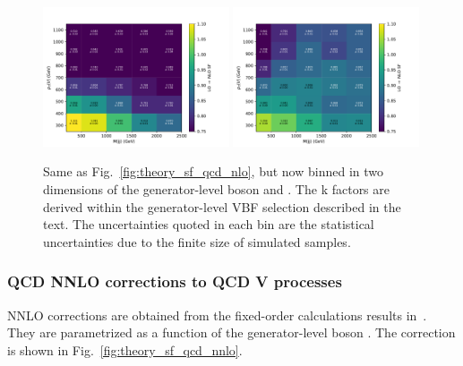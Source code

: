 \begin{figure}[ht!]
    \begin{center}
        \includegraphics[width=0.49\textwidth]{fig/theory/2d_dy_gen_vpt_vbf_dress.pdf}
        \includegraphics[width=0.49\textwidth]{fig/theory/2d_wjet_gen_vpt_vbf_dress.pdf} \\
        \caption{
            Same as Fig.~\ref{fig:theory_sf_qcd_nlo}, but now binned in two dimensions of the generator-level boson \pt and \mjj.
            The k factors are derived within the generator-level VBF selection described in the text.
            The uncertainties quoted in each bin are the statistical uncertainties due to the finite size of simulated samples.
          }
      \label{fig:theory_sf_qcd_nlo_2d}
    \end{center}
  \end{figure}

\subsubsection{QCD NNLO corrections to QCD V processes}

NNLO corrections are obtained from the fixed-order calculations results in~\cite{DMTheory}. They are parametrized as a function of the generator-level boson \pt. The correction is shown in Fig.~\ref{fig:theory_sf_qcd_nnlo}.


